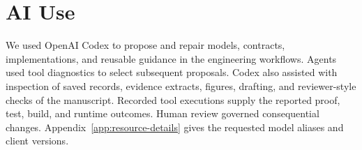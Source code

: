 \section*{AI Use}
\label{sec:ai-use}
We used OpenAI Codex to propose and repair models, contracts, implementations, and reusable guidance in the engineering workflows. Agents used tool diagnostics to select subsequent proposals. Codex also assisted with inspection of saved records, evidence extracts, figures, drafting, and reviewer-style checks of the manuscript. Recorded tool executions supply the reported proof, test, build, and runtime outcomes. Human review governed consequential changes. Appendix~\ref{app:resource-details} gives the requested model aliases and client versions.
